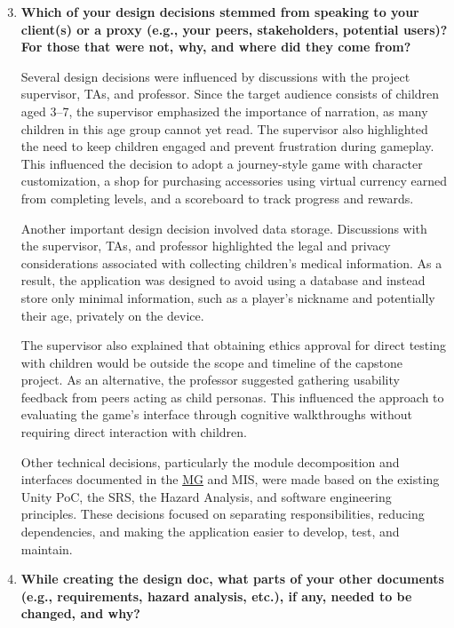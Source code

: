 \documentclass[10pt, titlepage]{article}
\newcommand{\mgurl}{https://github.com/team-hindsight/ophthamology-game/blob/main/pdfs/Design/SoftArchitecture/MG.pdf}
\newcommand{\mg}{\href{\mgurl}{MG}}
\begin{document}
\begin{enumerate}
    \setcounter{enumi}{2}

    \item \textbf{Which of your design decisions stemmed from speaking to your
    client(s) or a proxy (e.g., your peers, stakeholders, potential users)?
    For those that were not, why, and where did they come from?}

    Several design decisions were influenced by discussions
    with the project supervisor, TAs, and professor. Since the
    target audience consists of children aged 3--7, the
    supervisor emphasized the importance of narration, as
    many children in this age group cannot yet read. The
    supervisor also highlighted the need to keep children
    engaged and prevent frustration during gameplay. This
    influenced the decision to adopt a journey-style game
    with character customization, a shop for purchasing
    accessories using virtual currency earned from completing
    levels, and a scoreboard to track progress and rewards.

    Another important design decision involved data storage.
    Discussions with the supervisor, TAs, and professor
    highlighted the legal and privacy considerations associated
    with collecting children's medical information. As a
    result, the application was designed to avoid using a
    database and instead store only minimal information,
    such as a player's nickname and potentially their age,
    privately on the device.

    The supervisor also explained that obtaining ethics
    approval for direct testing with children would be
    outside the scope and timeline of the capstone project.
    As an alternative, the professor suggested gathering
    usability feedback from peers acting as child personas.
    This influenced the approach to evaluating the game's
    interface through cognitive walkthroughs without
    requiring direct interaction with children.

    Other technical decisions, particularly the module
    decomposition and interfaces documented in the \mg{} and MIS,
    were made based on the existing Unity PoC, the SRS,
    the Hazard Analysis, and software engineering principles.
    These decisions focused on separating responsibilities,
    reducing dependencies, and making the application easier
    to develop, test, and maintain.


    \item \textbf{While creating the design doc, what parts of your other
    documents (e.g., requirements, hazard analysis, etc.), if any, needed to
    be changed, and why?}


\end{enumerate}
\end{document}
